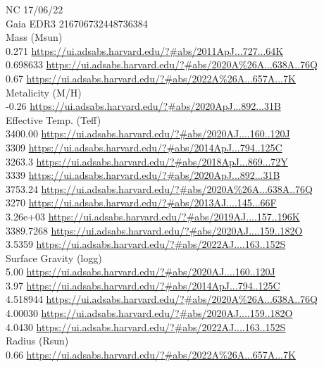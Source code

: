 NC 17/06/22\\
Gaia EDR3 216706732448736384\\
Mass (Msun)\\
0.271 \url{https://ui.adsabs.harvard.edu/?#abs/2011ApJ...727...64K}\\
0.698633 \url{https://ui.adsabs.harvard.edu/?#abs/2020A%26A...638A..76Q}\\
0.67 \url{https://ui.adsabs.harvard.edu/?#abs/2022A%26A...657A...7K}\\
Metalicity (M/H)\\
-0.26 \url{https://ui.adsabs.harvard.edu/?#abs/2020ApJ...892...31B}\\
Effective Temp. (Teff)\\
3400.00 \url{https://ui.adsabs.harvard.edu/?#abs/2020AJ....160..120J}\\
3309 \url{https://ui.adsabs.harvard.edu/?#abs/2014ApJ...794..125C}\\
3263.3 \url{https://ui.adsabs.harvard.edu/?#abs/2018ApJ...869...72Y}\\
3339 \url{https://ui.adsabs.harvard.edu/?#abs/2020ApJ...892...31B}\\
3753.24 \url{https://ui.adsabs.harvard.edu/?#abs/2020A%26A...638A..76Q}\\
3270 \url{https://ui.adsabs.harvard.edu/?#abs/2013AJ....145...66F}\\
3.26e+03 \url{https://ui.adsabs.harvard.edu/?#abs/2019AJ....157..196K}\\
3389.7268 \url{https://ui.adsabs.harvard.edu/?#abs/2020AJ....159..182O}\\
3.5359 \url{https://ui.adsabs.harvard.edu/?#abs/2022AJ....163..152S}\\
Surface Gravity (logg)\\
5.00 \url{https://ui.adsabs.harvard.edu/?#abs/2020AJ....160..120J}\\
3.97 \url{https://ui.adsabs.harvard.edu/?#abs/2014ApJ...794..125C}\\
4.518944 \url{https://ui.adsabs.harvard.edu/?#abs/2020A%26A...638A..76Q}\\
4.00030 \url{https://ui.adsabs.harvard.edu/?#abs/2020AJ....159..182O}\\
4.0430 \url{https://ui.adsabs.harvard.edu/?#abs/2022AJ....163..152S}\\
Radius (Rsun)\\
0.66 \url{https://ui.adsabs.harvard.edu/?#abs/2022A%26A...657A...7K}\\


